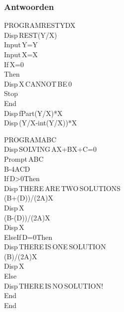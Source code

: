 \begin{frame}
\frametitle{Antwoorden}

\begin{minipage}{0.48\textwidth}
\begin{ticalc}[4.5cm]
	PROGRAM\:RESTYDX\\%
	\:Disp\,\qt REST(Y/X)\:\qt\\%
	\:Input\,\qt Y=\qt\comma Y\\%
	\:Input\,\qt X=\qt\comma X\\%
	\:If\,X=0\\%
	\:Then\\%
	\:Disp\,\qt X\,CANNOT\,BE\,0\qt\\%
	\:Stop\\%
	\:End\\%
	\:Disp\,fPart(Y/X)*X\\%
	\:Disp\,(Y/X-int(Y/X))*X%
\end{ticalc}
\end{minipage}
\begin{minipage}{0.48\textwidth}
\begin{ticalc}[5.5cm]
	PROGRAM\:ABC\\%
	\:Disp\,\qt SOLVING\,AX\sq+BX+C=0\qt \\%
	\:Prompt\,A\comma B\comma C \\%
	\:B\sq-4AC\>D \\%
	\:If\,D>0\:Then\\%
	\:Disp\,\qt THERE\,ARE\,TWO\,SOLUTIONS\:\qt \\%
	\:(\min B+\sqrt(D))/(2A)\>X \\%
	\:Disp\,X \\%
	\:(\min B-\sqrt(D))/(2A)\>X \\%
	\:Disp\,X\\%
	\:Else\:If\,D=0\:Then\\%
	\:Disp\,\qt THERE\,IS\,ONE\,SOLUTION\:\qt \\%
	\:(\min B)/(2A)\>X \\%
	\:Disp\,X \\%
	\:Else\\%
	\:Disp\,\qt THERE\,IS\,NO\,SOLUTION!\qt \\%
	\:End\\%
	\:End
\end{ticalc}
\end{minipage}




\end{frame}





